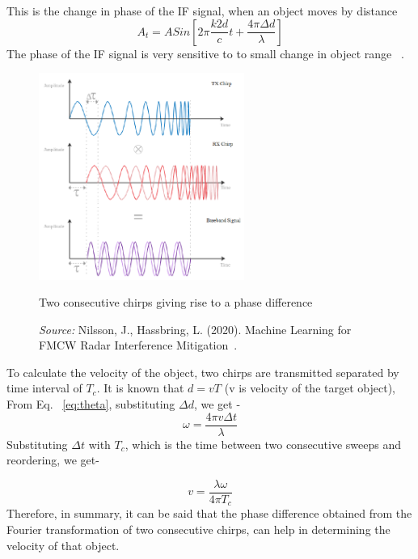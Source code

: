 This is the change in phase of the IF signal, when an object moves by distance 
\begin{equation}\label{eq:eq1}
A_{t}= ASin[2\pi \frac{k2d}{c}t + \frac{4\pi \Delta d}{\lambda}]
\end{equation}
The phase of the IF signal is very sensitive to to small change in object range ~\cite{rao_2017}.

 \begin{figure}[ht]
  \begin{center}
    \includegraphics[width=0.6\textwidth]{Master's thesis/images/delay_sweeps.PNG} 
     
    \caption{Two consecutive chirps giving rise to a phase difference}
    \caption*{\textit{Source:} Nilsson, J., Hassbring, L. (2020). Machine Learning for FMCW Radar Interference Mitigation~\cite{nilsson2020machine}.}
    

    \label{fig:delay}
  \end{center}
\end{figure}  

To calculate the velocity of the object, two chirps are transmitted separated by time interval of $T_{c}$.
It is known that $d= vT$ (v is velocity of the target object), From Eq. ~\ref{eq:theta}, substituting $\Delta d$, we get -
\begin{equation}
    \omega= \frac{4\pi v \Delta t}{\lambda}
\end{equation}
Substituting $\Delta t$ with $T_{c}$, which is the time between two consecutive sweeps and reordering, we get-

\begin{equation}
    v= \frac{\lambda \omega}{4\pi T_{c}}
\end{equation}
Therefore, in summary, it can be said that the phase difference obtained from the Fourier transformation of two consecutive chirps, can help in determining the velocity of that object. 

